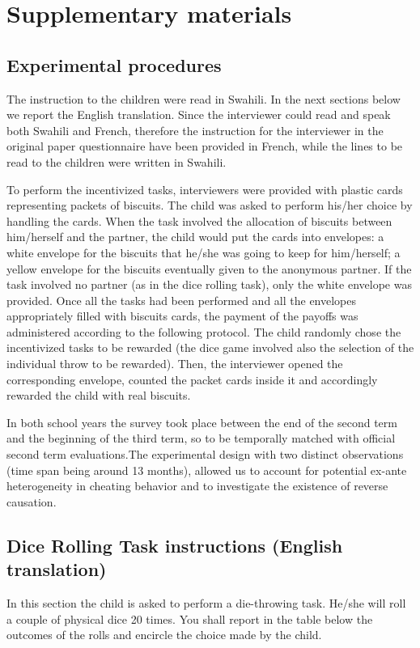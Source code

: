 \documentclass[authoryear, preprint, review, 12pt]{elsarticle}
\begin{document}




\clearpage

\setcounter{section}{0}
\renewcommand{\thesection}{S\arabic{section}}
\section{Supplementary materials}
\subsection{Experimental procedures}
The instruction to the children were read in Swahili. In the next sections below we report the English translation. Since the interviewer could read and speak both Swahili and French, therefore the instruction for the interviewer in the original paper questionnaire have been provided in French, while the lines to be read to the children were written in Swahili.

To perform the incentivized tasks, interviewers were provided with plastic cards representing packets of biscuits. The child was asked to perform his/her choice by handling the cards. When the task involved the allocation of biscuits between him/herself and the partner, the child would put the cards into envelopes: a white envelope for the biscuits that he/she was going to keep for him/herself; a yellow envelope for the biscuits eventually given to the anonymous partner. If the task involved no partner (as in the dice rolling task), only the white envelope was provided. 
Once all the tasks had been performed and all the envelopes appropriately filled with biscuits cards, the payment of the payoffs was administered according to the following protocol. The child randomly chose the incentivized tasks to be rewarded (the dice game involved also the selection of the individual throw to be rewarded). Then, the interviewer opened the corresponding envelope, counted the packet cards inside it and accordingly rewarded the child with real biscuits.

In both school years the survey took place between the end of the second term and the beginning of the third term, so to be temporally matched with official second term evaluations.The experimental design with two distinct observations (time span being around 13 months), allowed us to account for potential ex-ante heterogeneity in cheating behavior and to investigate the existence of reverse causation.

\subsection{Dice Rolling Task instructions (English translation)}
In this section the child is asked to perform a die-throwing task. He/she will roll a couple of physical dice 20 times. You shall report in the table below the outcomes of the rolls and encircle the choice made by the child.
\end{document}
